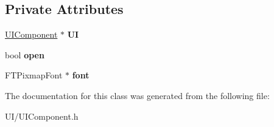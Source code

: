 \subsection*{Private Attributes}
\begin{DoxyCompactItemize}
\item 
\hypertarget{classEditorViewportButton_a76782e6db44130c925ca51412ea82b2b}{\hyperlink{classUIComponent}{U\-I\-Component} $\ast$ {\bfseries U\-I}}\label{classEditorViewportButton_a76782e6db44130c925ca51412ea82b2b}

\item 
\hypertarget{classEditorViewportButton_a66ba90699ffe12aa26640fb21a9ab2e0}{bool {\bfseries open}}\label{classEditorViewportButton_a66ba90699ffe12aa26640fb21a9ab2e0}

\item 
\hypertarget{classEditorViewportButton_ac95459c5ba70fe32af94e07c40299548}{F\-T\-Pixmap\-Font $\ast$ {\bfseries font}}\label{classEditorViewportButton_ac95459c5ba70fe32af94e07c40299548}

\end{DoxyCompactItemize}


The documentation for this class was generated from the following file\-:\begin{DoxyCompactItemize}
\item 
U\-I/U\-I\-Component.\-h\end{DoxyCompactItemize}
